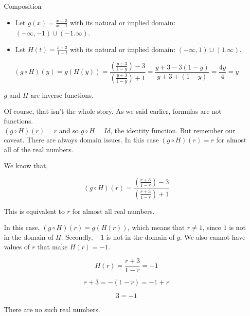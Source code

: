 \documentclass{ximera}
\begin{document}
\begin{example} Composition



\begin{itemize}
\item Let $g(x) = \frac{x-3}{x+1}$ with its natural or implied domain: $(-\infty, -1) \cup (-1. \infty)$. \\

\item Let $H(t) = \frac{t+3}{1-t}$ with its natural or implied domain: $(-\infty, 1) \cup (1. \infty)$.
\end{itemize}



\[
(g \circ H)(y) = g(H(y)) = \frac{\left( \frac{y+3}{1-y} \right) - 3}{\left(  \frac{y+3}{1-y}\right) + 1} = \frac{y+3-3(1-y)}{y+3+(1-y)} = \frac{4y}{4} = y
\]



$g$ and $H$ are inverse functions.




\end{example}

Of course, that isn't the whole story.  As we said earlier, formulas are not functions. \\

$(g \circ H)(r) = r$ and so $g \circ H = Id$, the identity function.  But remember our caveat.  There are always domain issues.  In this case $(g \circ H)(r) = r$ for almost all of the real numbers.

We know that, 


\[
(g \circ H)(r) = \frac{\left( \frac{r+3}{1-r} \right) - 3}{\left(  \frac{r+3}{1-r}\right) + 1} 
\]


This is equivalent to $r$ for almost all real numbers.


In this case, $(g \circ H)(r) = g(H(r))$, which means that $r \ne 1$, since $1$ is not in the domain of $H$.  Secondly, $-1$ is not in the domain of $g$.  We also cannot have values of $r$ that make $H(r) = -1$.




\[
H(r) = \frac{r+3}{1-r} = -1
\]

\[
r + 3 = -(1-r) = -1 + r
\]


\[
3 = -1
\]


There are no such real numbers.
\end{document}
